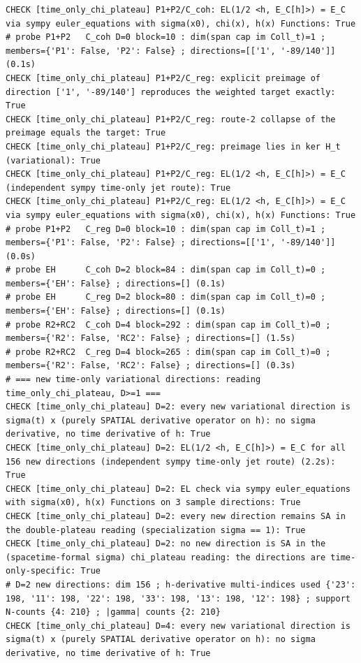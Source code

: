 \documentclass{article}
\theoremstyle{remark}
\begin{document}
\begin{lstlisting}
CHECK [time_only_chi_plateau] P1+P2/C_coh: EL(1/2 <h, E_C[h]>) = E_C via sympy euler_equations with sigma(x0), chi(x), h(x) Functions: True
# probe P1+P2   C_coh D=0 block=10 : dim(span cap im Coll_t)=1 ; members={'P1': False, 'P2': False} ; directions=[['1', '-89/140']] (0.1s)
CHECK [time_only_chi_plateau] P1+P2/C_reg: explicit preimage of direction ['1', '-89/140'] reproduces the weighted target exactly: True
CHECK [time_only_chi_plateau] P1+P2/C_reg: route-2 collapse of the preimage equals the target: True
CHECK [time_only_chi_plateau] P1+P2/C_reg: preimage lies in ker H_t (variational): True
CHECK [time_only_chi_plateau] P1+P2/C_reg: EL(1/2 <h, E_C[h]>) = E_C (independent sympy time-only jet route): True
CHECK [time_only_chi_plateau] P1+P2/C_reg: EL(1/2 <h, E_C[h]>) = E_C via sympy euler_equations with sigma(x0), chi(x), h(x) Functions: True
# probe P1+P2   C_reg D=0 block=10 : dim(span cap im Coll_t)=1 ; members={'P1': False, 'P2': False} ; directions=[['1', '-89/140']] (0.0s)
# probe EH      C_coh D=2 block=84 : dim(span cap im Coll_t)=0 ; members={'EH': False} ; directions=[] (0.1s)
# probe EH      C_reg D=2 block=80 : dim(span cap im Coll_t)=0 ; members={'EH': False} ; directions=[] (0.1s)
# probe R2+RC2  C_coh D=4 block=292 : dim(span cap im Coll_t)=0 ; members={'R2': False, 'RC2': False} ; directions=[] (1.5s)
# probe R2+RC2  C_reg D=4 block=265 : dim(span cap im Coll_t)=0 ; members={'R2': False, 'RC2': False} ; directions=[] (0.3s)
# === new time-only variational directions: reading time_only_chi_plateau, D>=1 ===
CHECK [time_only_chi_plateau] D=2: every new variational direction is sigma(t) x (purely SPATIAL derivative operator on h): no sigma derivative, no time derivative of h: True
CHECK [time_only_chi_plateau] D=2: EL(1/2 <h, E_C[h]>) = E_C for all 156 new directions (independent sympy time-only jet route) (2.2s): True
CHECK [time_only_chi_plateau] D=2: EL check via sympy euler_equations with sigma(x0), h(x) Functions on 3 sample directions: True
CHECK [time_only_chi_plateau] D=2: every new direction remains SA in the double-plateau reading (specialization sigma == 1): True
CHECK [time_only_chi_plateau] D=2: no new direction is SA in the (spacetime-formal sigma) chi_plateau reading: the directions are time-only-specific: True
# D=2 new directions: dim 156 ; h-derivative multi-indices used {'23': 198, '11': 198, '22': 198, '33': 198, '13': 198, '12': 198} ; support N-counts {4: 210} ; |gamma| counts {2: 210}
CHECK [time_only_chi_plateau] D=4: every new variational direction is sigma(t) x (purely SPATIAL derivative operator on h): no sigma derivative, no time derivative of h: True

\end{lstlisting}
\end{document}
